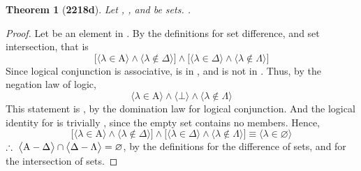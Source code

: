 \documentclass[preview]{standalone}
\newtheorem{theorem}{Theorem}
\begin{document}
\begin{theorem}[\textbf{2218d}]
    Let , \bm{$\Lambda$}, and \bm{$\Delta$} be sets. 
    .
\end{theorem}
\begin{proof}
    Let \bm{$\lambda$} be an element in 
    .
    By the definitions for set difference, and set intersection, that is
    \begin{equation*}
        \bigg[
            \Big \langle \lambda \in \mathrm{A} \Big \rangle
                \land
            \Big \langle \lambda \notin \Delta \Big \rangle
        \bigg]
            \land
        \bigg[
            \Big \langle \lambda \in \Delta \Big \rangle
                \land
            \Big \langle \lambda \notin \Lambda \Big \rangle
        \bigg]
    \end{equation*}
    Since logical conjunction is associative, 
    \bm{$\lambda$} is in \bm{$\Delta$},
    and \bm{$\lambda$} is not in \bm{$\Delta$}. 
    Thus, by the negation law of logic,
    \begin{equation*}
        \Big \langle \lambda \in \mathrm{A} \Big \rangle
            \land
        \Big \langle \bot \Big \rangle
            \land
        \Big \langle \lambda \notin \Lambda \Big \rangle
    \end{equation*}
    This statement is \bm{$\bot$}, 
    by the domination law for logical conjunction. 
    And the logical identity for \bm{$\lambda \in \varnothing$} is trivially \bm{$\bot$},
    since the empty set contains no members. 
    Hence,
    \begin{equation*}
        \bigg[
            \Big \langle \lambda \in \mathrm{A} \Big \rangle
                \land
            \Big \langle \lambda \notin \Delta \Big \rangle
        \bigg]
            \land
        \bigg[
            \Big \langle \lambda \in \Delta \Big \rangle
                \land
            \Big \langle \lambda \notin \Lambda \Big \rangle
        \bigg]
            \equiv
        \Big \langle \lambda \in \varnothing \Big \rangle
    \end{equation*}
    $\therefore \text{\space} \relax{
    \big \langle \mathrm{A} - \Delta \big \rangle
        \cap 
    \big \langle \Delta - \Lambda \big \rangle
        = 
    \varnothing
    }$,
    by the definitions for the difference of sets, 
    and for the intersection of sets.
\end{proof}
\end{document}
